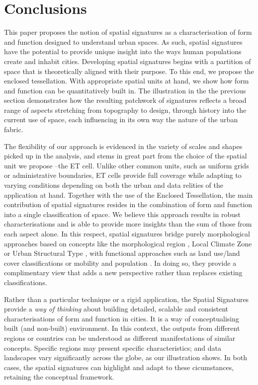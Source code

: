 \section{Conclusions}
\label{sec:conclusions}

This paper proposes the notion of spatial signatures as a characterisation of
form and function designed to understand urban spaces.
%
As such,
spatial signatures have the potential to provide unique insight into the ways
human populations create and inhabit cities.
%
Developing spatial signatures begins with a partition of space that is
theoretically aligned with their purpose. To this end, we propose the enclosed
tessellation. With appropriate spatial units at hand, we show how form and
function can be quantitatively built in.
The illustration in the the previous section demonstrates how
the resulting patchwork of signatures reflects a broad range of aspects
stretching from topography to design, through history into the current use
of space, each influencing in its own way the nature of the urban fabric.

The flexibility of our approach is evidenced in the variety of scales and
shapes picked up in the analysis, and stems in great part from the
choice of the spatial unit we propose --the ET cell. Unlike other common
units, such as uniform grids or administrative boundaries, ET cells provide
full coverage while adapting to
varying conditions depending on both the urban and data relities of the
application at hand.
Together with the use of the Enclosed Tessellation, the main contribution of
spatial signatures resides in the combination of form and function into a
single classification of space.
%
We believe this approach results in robust characterisations and is able to
provide more insights than the sum of those from each aspect alone.
In this respect, spatial signatures bridge
purely morphological approaches based on concepts like the morphological region
\citep{oliveira2020}, Local Climate Zone \citep{stewart2012} or Urban
Structural Type \citep{lehner2019}, with functional approaches such as land
use/land cover classifications \citep{georganos2018very} or mobility and
population \citep{gale2016creating}.
%
In doing so, they provide a complimentary view that adds a new perspective
rather than replaces existing classifications.

Rather than a particular technique or a rigid application, the Spatial
Signatures provide a \textit{way of thinking} about building detailed,
scalable and consistent characterisations of form and function in cities.
It is a way of conceptualising built (and non-built) environment. In this
context, the outputs from different regions or countries can be understood as
different manifestations of similar concepts. Specific
regions may present specific characteristics; and data landscapes vary
significantly across the globe, as our illustration shows. In both cases, the
spatial signatures can highlight and adapt to these cicumstances, retaining
the conceptual framework.

